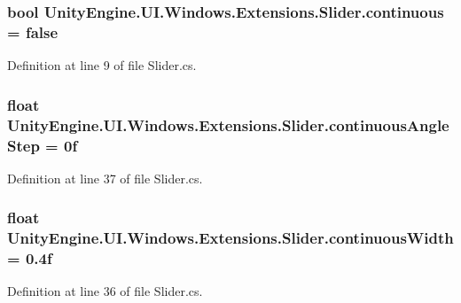 \subsubsection[{continuous}]{\setlength{\rightskip}{0pt plus 5cm}bool Unity\+Engine.\+U\+I.\+Windows.\+Extensions.\+Slider.\+continuous = false}\label{class_unity_engine_1_1_u_i_1_1_windows_1_1_extensions_1_1_slider_abb00da6ff06ac8011e1937e3e133f6d1}


Definition at line 9 of file Slider.\+cs.

\hypertarget{class_unity_engine_1_1_u_i_1_1_windows_1_1_extensions_1_1_slider_a18f304a46a337375b97309eed114a1f7}{}
\subsubsection[{continuous\+Angle\+Step}]{\setlength{\rightskip}{0pt plus 5cm}float Unity\+Engine.\+U\+I.\+Windows.\+Extensions.\+Slider.\+continuous\+Angle\+Step = 0f}\label{class_unity_engine_1_1_u_i_1_1_windows_1_1_extensions_1_1_slider_a18f304a46a337375b97309eed114a1f7}


Definition at line 37 of file Slider.\+cs.

\hypertarget{class_unity_engine_1_1_u_i_1_1_windows_1_1_extensions_1_1_slider_ae061ca4766a69e1310653c1a236b4ffe}{}
\subsubsection[{continuous\+Width}]{\setlength{\rightskip}{0pt plus 5cm}float Unity\+Engine.\+U\+I.\+Windows.\+Extensions.\+Slider.\+continuous\+Width = 0.\+4f}\label{class_unity_engine_1_1_u_i_1_1_windows_1_1_extensions_1_1_slider_ae061ca4766a69e1310653c1a236b4ffe}


Definition at line 36 of file Slider.\+cs.

